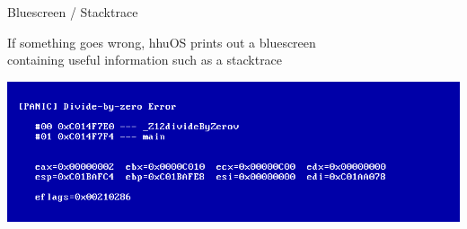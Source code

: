 \begin{frame}{Bluescreen / Stacktrace}

\begin{center}
	If something goes wrong, hhuOS prints out a bluescreen \\containing useful information such as a stacktrace
\end{center}

\begin{center}
	\begin{minipage}{0.9\textwidth}
		\includegraphics[width=\textwidth]{img/hhuos_bluescreen}
	\end{minipage}
\end{center}

\end{frame}